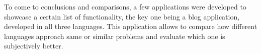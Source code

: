To come to conclusions and comparisons, a few applications were developed to showcase a certain list of functionality, the key one being a blog application, developed in all three languages. This application allows to compare how different languages approach same or similar problems and evaluate which one is subjectively better. 